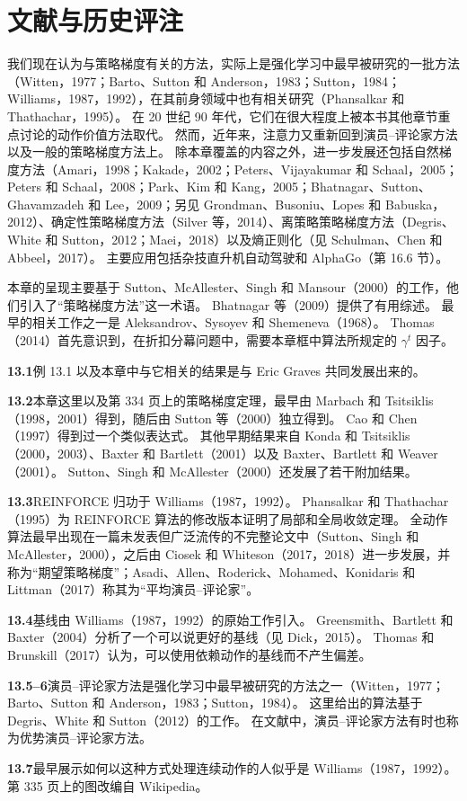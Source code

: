 \documentclass[UTF8, 12pt, fontset=fandol, oneside]{ctexart}
\begin{document}
\section*{文献与历史评注}

我们现在认为与策略梯度有关的方法，实际上是强化学习中最早被研究的一批方法（Witten，1977；Barto、Sutton 和 Anderson，1983；Sutton，1984；Williams，1987，1992），在其前身领域中也有相关研究（Phansalkar 和 Thathachar，1995）。
在 20 世纪 90 年代，它们在很大程度上被本书其他章节重点讨论的动作价值方法取代。
然而，近年来，注意力又重新回到演员--评论家方法以及一般的策略梯度方法上。
除本章覆盖的内容之外，进一步发展还包括自然梯度方法（Amari，1998；Kakade，2002；Peters、Vijayakumar 和 Schaal，2005；Peters 和 Schaal，2008；Park、Kim 和 Kang，2005；Bhatnagar、Sutton、Ghavamzadeh 和 Lee，2009；另见 Grondman、Busoniu、Lopes 和 Babuska，2012）、确定性策略梯度方法（Silver 等，2014）、离策略策略梯度方法（Degris、White 和 Sutton，2012；Maei，2018）以及熵正则化（见 Schulman、Chen 和 Abbeel，2017）。
主要应用包括杂技直升机自动驾驶和 AlphaGo（第 16.6 节）。

本章的呈现主要基于 Sutton、McAllester、Singh 和 Mansour（2000）的工作，他们引入了“策略梯度方法”这一术语。
Bhatnagar 等（2009）提供了有用综述。
最早的相关工作之一是 Aleksandrov、Sysoyev 和 Shemeneva（1968）。
Thomas（2014）首先意识到，在折扣分幕问题中，需要本章框中算法所规定的 $\gamma^t$ 因子。

\noindent\textbf{13.1}\quad 例 13.1 以及本章中与它相关的结果是与 Eric Graves 共同发展出来的。

\noindent\textbf{13.2}\quad 本章这里以及第 334 页上的策略梯度定理，最早由 Marbach 和 Tsitsiklis（1998，2001）得到，随后由 Sutton 等（2000）独立得到。
Cao 和 Chen（1997）得到过一个类似表达式。
其他早期结果来自 Konda 和 Tsitsiklis（2000，2003）、Baxter 和 Bartlett（2001）以及 Baxter、Bartlett 和 Weaver（2001）。
Sutton、Singh 和 McAllester（2000）还发展了若干附加结果。

\noindent\textbf{13.3}\quad REINFORCE 归功于 Williams（1987，1992）。
Phansalkar 和 Thathachar（1995）为 REINFORCE 算法的修改版本证明了局部和全局收敛定理。
全动作算法最早出现在一篇未发表但广泛流传的不完整论文中（Sutton、Singh 和 McAllester，2000），之后由 Ciosek 和 Whiteson（2017，2018）进一步发展，并称为“期望策略梯度”；Asadi、Allen、Roderick、Mohamed、Konidaris 和 Littman（2017）称其为“平均演员--评论家”。

\noindent\textbf{13.4}\quad 基线由 Williams（1987，1992）的原始工作引入。
Greensmith、Bartlett 和 Baxter（2004）分析了一个可以说更好的基线（见 Dick，2015）。
Thomas 和 Brunskill（2017）认为，可以使用依赖动作的基线而不产生偏差。

\noindent\textbf{13.5--6}\quad 演员--评论家方法是强化学习中最早被研究的方法之一（Witten，1977；Barto、Sutton 和 Anderson，1983；Sutton，1984）。
这里给出的算法基于 Degris、White 和 Sutton（2012）的工作。
在文献中，演员--评论家方法有时也称为优势演员--评论家方法。

\noindent\textbf{13.7}\quad 最早展示如何以这种方式处理连续动作的人似乎是 Williams（1987，1992）。
第 335 页上的图改编自 Wikipedia。
\end{document}
